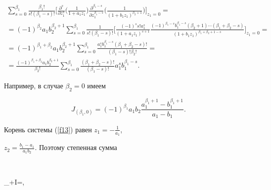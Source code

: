 \begin{exam}
\begin{gather*}
\sum_{s=0}^{\beta_1}\frac{\beta_1!}{s! (\beta_1-s)!}


\bigg[\frac{\partial^s}{\partial z_1^s}\bigg(


\frac 1{1+a_1z_1}\bigg)\frac{\partial^{\beta_1-s}}


{\partial z_1^{\beta_1-s}}


\bigg(\frac 1{(1+b_1z_1)^{\beta_2+1}}\bigg)\bigg]_{z_1=0}= \\


%


=(-1)^{\beta_2}a_1b_2^{\beta_2+1}\sum_{s=0}^{\beta_1}


\frac{1}{s! (\beta_1-s)!}


\bigg[\frac{(-1)^s s! a_1^s}{(1+a_1z_1)^{s+1}}


\frac{(-1)^{\beta_1-s} b_1^{\beta_1-s} (\beta_2+1)\dotsb(\beta_1+\beta_2-s)}


{(1+b_1z_1)^{\beta_1+\beta_2+1-s}}\bigg]_{z_1=0}= \\


%


=(-1)^{\beta_1+\beta_2}a_1b_2^{\beta_2+1}


\sum_{s=0}^{\beta_1}\frac{a_1^sb_1^{\beta_1-s}


(\beta_1+\beta_2-s)!}{(\beta_1-s)!\beta_2!}= \\


%


=\frac{(-1)^{\beta_1+\beta_2}a_1b_2^{\beta_2+1}}{\beta_2!}


\sum_{s=0}^{\beta_1}\frac{(\beta_1+\beta_2-s)!}{(\beta_1-s)!}


a_1^sb_1^{\beta_1-s}.


\end{gather*}


Например, в случае $\beta_2=0$ имеем


$$


J_{(\beta_1,0)}=(-1)^{\beta_1}a_1b_2\frac{a_1^{\beta_1+1}-b_1^{\beta_1+1}}


{a_1-b_1}.


$$





Корень системы (\ref{f13}) равен $z_1=-\frac 1{a_1}$,


$z_2=\frac{b_1-a_1}{a_1b_2}$. Поэтому степенная сумма


$$


\sigma_{\beta+I}=,



\end{exam}
